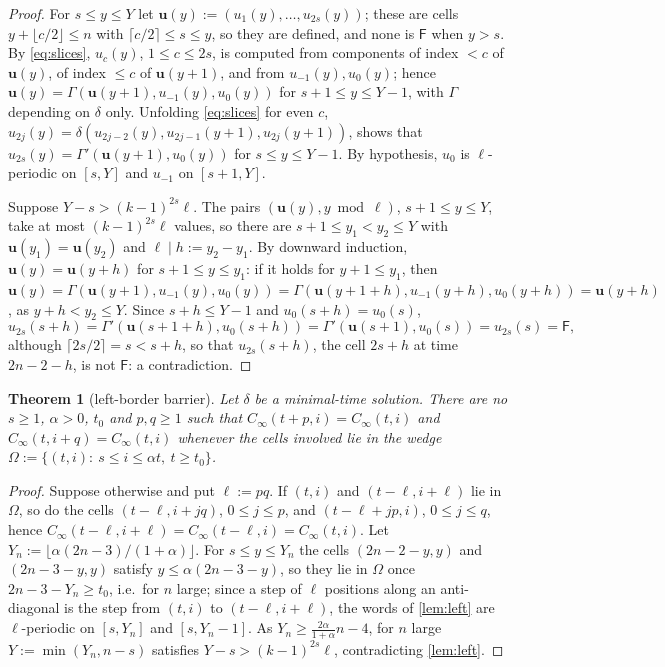 \documentclass[3p]{elsarticle}
\newtheorem{theorem}{Theorem}[section]
\theoremstyle{remark}
\begin{document}
\begin{proof}
For $s\le y\le Y$ let $\mathbf u(y):=(u_1(y),\dots,u_{2s}(y))$; these are cells
$y+\lfloor c/2\rfloor\le n$ with $\lceil c/2\rceil\le s\le y$, so they are
defined, and none is $\mathsf F$ when $y>s$. By \eqref{eq:slices}, $u_c(y)$,
$1\le c\le 2s$, is computed from components of index $<c$ of $\mathbf u(y)$, of
index $\le c$ of $\mathbf u(y+1)$, and from $u_{-1}(y),u_0(y)$; hence
$\mathbf u(y)=\Gamma(\mathbf u(y+1),u_{-1}(y),u_0(y))$ for $s+1\le y\le Y-1$,
with $\Gamma$ depending on $\delta$ only. Unfolding \eqref{eq:slices} for even
$c$, $u_{2j}(y)=\delta(u_{2j-2}(y),u_{2j-1}(y+1),u_{2j}(y+1))$, shows that
$u_{2s}(y)=\Gamma'(\mathbf u(y+1),u_0(y))$ for $s\le y\le Y-1$. By hypothesis,
$u_0$ is $\ell$-periodic on $[s,Y]$ and $u_{-1}$ on $[s+1,Y]$.

Suppose $Y-s>(k-1)^{2s}\ell$. The pairs $(\mathbf u(y),y\bmod\ell)$,
$s+1\le y\le Y$, take at most $(k-1)^{2s}\ell$ values, so there are
$s+1\le y_1<y_2\le Y$ with $\mathbf u(y_1)=\mathbf u(y_2)$ and $\ell\mid
h:=y_2-y_1$. By downward induction, $\mathbf u(y)=\mathbf u(y+h)$ for
$s+1\le y\le y_1$: if it holds for $y+1\le y_1$, then $\mathbf
u(y)=\Gamma(\mathbf u(y+1),u_{-1}(y),u_0(y))=\Gamma(\mathbf
u(y+1+h),u_{-1}(y+h),u_0(y+h))=\mathbf u(y+h)$, as $y+h<y_2\le Y$. Since
$s+h\le Y-1$ and $u_0(s+h)=u_0(s)$,
\[
u_{2s}(s+h)=\Gamma'(\mathbf u(s+1+h),u_0(s+h))=\Gamma'(\mathbf u(s+1),u_0(s))=u_{2s}(s)=\mathsf F,
\]
although $\lceil 2s/2\rceil=s<s+h$, so that $u_{2s}(s+h)$, the cell $2s+h$ at
time $2n-2-h$, is not $\mathsf F$: a contradiction.
\end{proof}

\begin{theorem}[left-border barrier]\label{thm:left}
Let $\delta$ be a minimal-time solution. There are no $s\ge1$, $\alpha>0$, $t_0$
and $p,q\ge1$ such that $C_\infty(t+p,i)=C_\infty(t,i)$ and
$C_\infty(t,i+q)=C_\infty(t,i)$ whenever the cells involved lie in the wedge
$\Omega:=\{(t,i):\ s\le i\le\alpha t,\ t\ge t_0\}$.
\end{theorem}

\begin{proof}
Suppose otherwise and put $\ell:=pq$. If $(t,i)$ and $(t-\ell,i+\ell)$ lie in
$\Omega$, so do the cells $(t-\ell,i+jq)$, $0\le j\le p$, and
$(t-\ell+jp,i)$, $0\le j\le q$, hence
$C_\infty(t-\ell,i+\ell)=C_\infty(t-\ell,i)=C_\infty(t,i)$. Let
$Y_n:=\lfloor\alpha(2n-3)/(1+\alpha)\rfloor$. For $s\le y\le Y_n$ the cells
$(2n-2-y,y)$ and $(2n-3-y,y)$ satisfy $y\le\alpha(2n-3-y)$, so they lie in
$\Omega$ once $2n-3-Y_n\ge t_0$, i.e.\ for $n$ large; since a step of $\ell$
positions along an anti-diagonal is the step from $(t,i)$ to
$(t-\ell,i+\ell)$, the words of \cref{lem:left} are $\ell$-periodic on
$[s,Y_n]$ and $[s,Y_n-1]$. As $Y_n\ge\frac{2\alpha}{1+\alpha}n-4$, for $n$ large
$Y:=\min(Y_n,n-s)$ satisfies $Y-s>(k-1)^{2s}\ell$, contradicting
\cref{lem:left}.
\end{proof}
\end{document}
